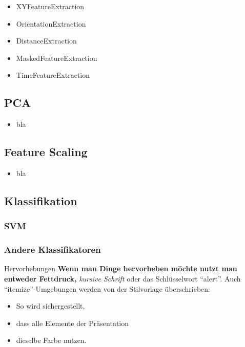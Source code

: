 \documentclass{beamer}
\begin{document}
\begin{frame}
  \begin{itemize}
    \item XYFeatureExtraction
    \item OrientationExtraction
    \item DistanceExtraction
    \item MaskedFeatureExtraction
    \item TimeFeatureExtraction
  \end{itemize}
\end{frame}

\subsection{PCA}
\begin{frame}
  \begin{itemize}
    \item bla
  \end{itemize}
\end{frame}

\subsection{Feature Scaling}
\begin{frame}
  \begin{itemize}
    \item bla
  \end{itemize}
\end{frame}

\subsection{Klassifikation}
\subsubsection{SVM}
\subsubsection{Andere Klassifikatoren}
\begin{frame}
  \begin{block}{Hervorhebungen}
    \textbf{Wenn man Dinge hervorheben möchte nutzt man entweder Fettdruck,}
    \textit{ kursive Schrift} \alert{ oder das Schlüsselwort ``alert''}.
  Auch ``itemize''-Umgebungen werden von der Stilvorlage überschrieben:
  \end{block}
  \pause
  \begin{itemize}
    \item So wird sichergestellt,
    \item dass alle Elemente der Präsentation
    \item dieselbe Farbe nutzen.
  \end{itemize}
\end{frame}
\end{document}
